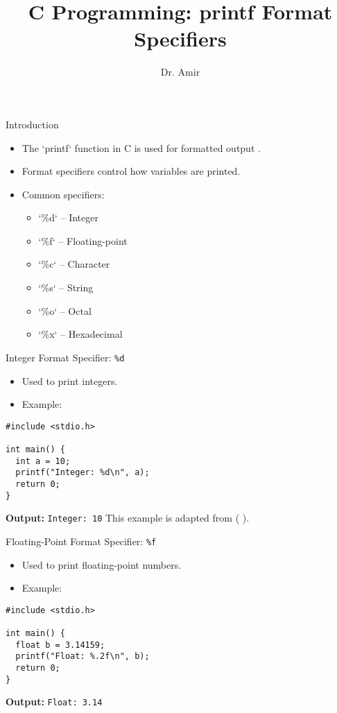 \documentclass{beamer}
\title{C Programming: printf Format Specifiers}
\author{Dr. Amir}
\date{}
\begin{document}
\begin{frame}
  \titlepage
\end{frame}

\begin{frame}{Introduction}
  \begin{itemize}
    \item The `printf` function in C is used for formatted output \citep{kernighan1988c}.
    \item Format specifiers control how variables are printed.
    \item Common specifiers:
    \begin{itemize}
      \item `\%d` – Integer
      \item `\%f` – Floating-point
      \item `\%c` – Character
      \item `\%s` – String
      \item `\%o` – Octal
      \item `\%x` – Hexadecimal
    \end{itemize}
  \end{itemize}
\end{frame}

\begin{frame}[fragile]{Integer Format Specifier: \texttt{\%d}}
  \begin{itemize}
    \item Used to print integers.
    \item Example:
  \end{itemize}
  \begin{lstlisting}
#include <stdio.h>

int main() {
  int a = 10;
  printf("Integer: %d\n", a);
  return 0;
}
  \end{lstlisting}
  \textbf{Output:} \texttt{Integer: 10}
\vskip 0.5cm
  \footnotesize{This example is adapted from ( \cite{prata2004c}).}
\end{frame}

\begin{frame}[fragile]{Floating-Point Format Specifier: \texttt{\%f}}
  \begin{itemize}
    \item Used to print floating-point numbers.
    \item Example:
  \end{itemize}
  \begin{lstlisting}
#include <stdio.h>

int main() {
  float b = 3.14159;
  printf("Float: %.2f\n", b);
  return 0;
}
  \end{lstlisting}
  \textbf{Output:} \texttt{Float: 3.14}
\end{frame}
\end{document}
